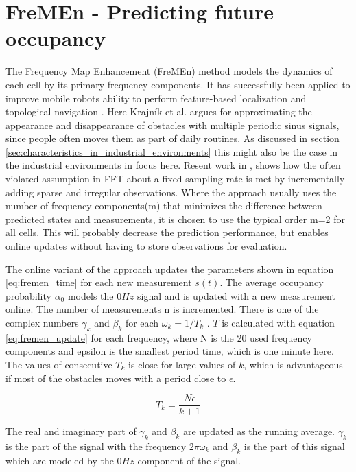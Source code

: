 \section{FreMEn - Predicting future occupancy}
\label{sec:fremen}
The  Frequency Map Enhancement (FreMEn) method models the dynamics of each cell by its primary frequency components. It has successfully been applied to improve mobile robots ability to perform feature-based localization \cite{online_fremen} and topological navigation \cite{fentanes2015}. Here Krajník et al. argues for approximating the appearance and disappearance of obstacles with multiple periodic sinus signals, since people often moves them as part of daily routines. As discussed in section \ref{sec:characteristics_in_industrial_environments} this might also be the case in the industrial environments in focus here. Resent work in \cite{life_long_exploration}, shows how the often violated assumption in FFT about a fixed sampling rate is met by incrementally adding sparse and irregular observations. Where the approach usually uses the number of frequency components(m) that minimizes the difference between predicted states and measurements, it is chosen to use the typical order m=2 \cite{life_long_exploration} for all cells. This will probably decrease the prediction performance, but enables online updates without having to store observations for evaluation.

The online variant of the approach updates the parameters shown in equation \ref{eq:fremen_time} for each new measurement $s(t)$. 
The average occupancy probability $\alpha_0$ models the $0Hz$ signal and is updated with a new measurement online. 
The number of measurements n is incremented. There is one of the complex numbers $\gamma_k$ and $\beta_k$ for each $\omega_k=1/T_k$ . 
$T$ is calculated with equation \ref{eq:fremen_update} for each frequency, where N is the 20 used frequency components and epsilon is the smallest period time, which is one minute here. 
The values of consecutive $T_k$ is close for large values of $k$, which is advantageous if most of the obstacles moves with a period close to $\epsilon$.

\begin{equation}
    T_k = \frac{N \epsilon}{k+1}
    \label{eq:fremen_time}
\end{equation}

The real and imaginary part of $\gamma_k$ and $\beta_k$ are updated as the running average. $\gamma_k$ is the part of the signal with the frequency $2 \pi \omega_k$ and $\beta_k$ is the part of this signal which are modeled by the $0Hz$ component of the signal.

